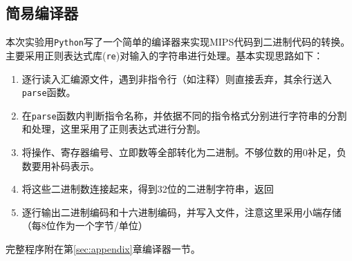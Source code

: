 
\subsection{简易编译器}
\qquad 本次实验用\verb'Python'写了一个简单的编译器来实现MIPS代码到二进制代码的转换。主要采用正则表达式库(\verb're')对输入的字符串进行处理。基本实现思路如下：
\begin{enumerate}
    \item 逐行读入汇编源文件，遇到非指令行（如注释）则直接丢弃，其余行送入\verb'parse'函数。
    \item 在\verb'parse'函数内判断指令名称，并依据不同的指令格式分别进行字符串的分割和处理，这里采用了正则表达式进行分割。
    \item 将操作、寄存器编号、立即数等全部转化为二进制。不够位数的用0补足，负数要用补码表示。
    \item 将这些二进制数连接起来，得到32位的二进制字符串，返回
    \item 逐行输出二进制编码和十六进制编码，并写入文件，注意这里采用小端存储（每8位作为一个字节/单位）
\end{enumerate}
\par 完整程序附在第\ref{sec:appendix}章编译器一节。
